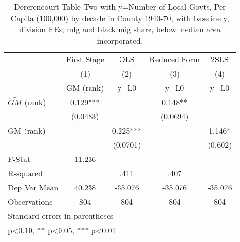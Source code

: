 \begin{table}[htbp]\centering
\def\sym#1{\ifmmode^{#1}\else\(^{#1}\)\fi}
\caption{Dererencourt Table Two with y=Number of Local Govts, Per Capita (100,000) by decade in County 1940-70, with baseline y, division FEs, mfg and black mig share, below median area incorporated.}
\begin{tabular}{l*{4}{c}}
\toprule
                    & First Stage   &         OLS   &Reduced Form   &        2SLS   \\
                    &\multicolumn{1}{c}{(1)}&\multicolumn{1}{c}{(2)}&\multicolumn{1}{c}{(3)}&\multicolumn{1}{c}{(4)}\\
                    &\multicolumn{1}{c}{GM  (rank)}&\multicolumn{1}{c}{y\_L0}&\multicolumn{1}{c}{y\_L0}&\multicolumn{1}{c}{y\_L0}\\
\midrule
$\hat{GM}$ (rank)   &       0.129***&               &       0.148** &               \\
                    &    (0.0483)   &               &    (0.0694)   &               \\
\addlinespace
GM  (rank)          &               &       0.225***&               &       1.146*  \\
                    &               &    (0.0701)   &               &     (0.602)   \\
\midrule
F-Stat              &      11.236   &               &               &               \\
R-squared           &               &        .411   &        .407   &               \\
Dep Var Mean        &      40.238   &     -35.076   &     -35.076   &     -35.076   \\
Observations        &         804   &         804   &         804   &         804   \\
\bottomrule
\multicolumn{5}{l}{\footnotesize Standard errors in parentheses}\\
\multicolumn{5}{l}{\footnotesize * p<0.10, ** p<0.05, *** p<0.01}\\
\end{tabular}
\end{table}
